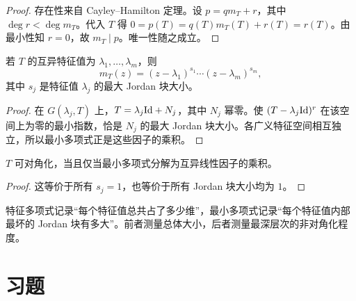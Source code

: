 \begin{proof}
存在性来自 Cayley--Hamilton 定理。设 $p=q m_T+r$，其中 $\deg r<\deg m_T$。代入 $T$ 得 $0=p(T)=q(T)m_T(T)+r(T)=r(T)$。由最小性知 $r=0$，故 $m_T\mid p$。唯一性随之成立。
\end{proof}

\begin{theorem}
若 $T$ 的互异特征值为 $\lambda_1,\dots,\lambda_m$，则
\[
m_T(z)=(z-\lambda_1)^{s_1}\cdots(z-\lambda_m)^{s_m},
\]
其中 $s_j$ 是特征值 $\lambda_j$ 的最大 Jordan 块大小。
\end{theorem}

\begin{proof}
在 $G(\lambda_j,T)$ 上，$T=\lambda_j\mathrm{Id}+N_j$，其中 $N_j$ 幂零。使 $(T-\lambda_j\mathrm{Id})^r$ 在该空间上为零的最小指数，恰是 $N_j$ 的最大 Jordan 块大小。各广义特征空间相互独立，所以最小多项式正是这些因子的乘积。
\end{proof}

\begin{corollary}
$T$ 可对角化，当且仅当最小多项式分解为互异线性因子的乘积。
\end{corollary}

\begin{proof}
这等价于所有 $s_j=1$，也等价于所有 Jordan 块大小均为 $1$。
\end{proof}

\begin{remark}
特征多项式记录“每个特征值总共占了多少维”，最小多项式记录“每个特征值内部最坏的 Jordan 块有多大”。前者测量总体大小，后者测量最深层次的非对角化程度。
\end{remark}

\section*{习题}

